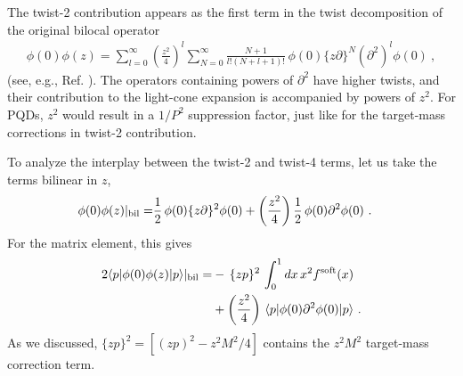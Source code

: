 \documentclass[final,5p,times,twocolumn]{elsarticle}
\newcommand{\nn}{\nonumber \\ }
\begin{document}
 




 
 The twist-2 contribution appears as the first term in the twist  decomposition 
 of the original bilocal operator 
 \begin{align}
 \phi (0) \phi(z) = \sum_{l=0}^{\infty} 
 \left ( \frac{z^2 }{4}  \right )^l  \sum_{N=0}^{\infty} 
 \frac{N+1}{l!(N+l+1)!}  \,
 \phi(0) 
\{z{\partial} \}^{N}
 ({\partial}^2)^l 
 \phi(0)  \  , 
  \label{expandphi}
\end{align}
 (see, e.g., Ref. \cite{Radyushkin:1983mj}).
 The operators containing powers of  ${\partial}^2$ have higher twists,
and  their contribution to the light-cone expansion
 is accompanied by powers of $z^2$.  For PQDs, $z^2$ would result 
 in a $1/P^2$ suppression factor, just like for  the target-mass corrections in twist-2 contribution.

 
 
  
 To analyze the interplay between the twist-2 and twist-4 terms, let us take the terms bilinear in $z$, 
  \begin{align}
 \phi (0) \phi(z)|_{\rm bil}  =  & 
 \frac{1}{2}  \,
 \phi(0) 
\{z{\partial} \}^{2}
 \phi(0)  +
 \left ( \frac{z^2 }{4}  \right ) 
 \frac{1}{2}  \,
 \phi(0) 
 {\partial}^2 
 \phi(0)  
 \  .  
  \label{bil}
\end{align}
For the matrix element, this gives
  \begin{align}
2 \langle p |  \phi (0) \phi(z) |p \rangle|_{\rm bil}  =  & 
 -  \,\{zp \}^{2} \,  \int_0^1 dx\,  x^2 f^{\rm soft}(x) 
  \nn & 
  +
 \left ( \frac{z^2 }{4}  \right ) 
 \,
 \langle p |  \phi (0)  {\partial}^2 
 \phi(0)   |p \rangle
 \  . 
  \label{mebil}
\end{align}
As we discussed, $\{zp \}^{2} = \left [  (zp)^{2}- {z^2M^2 }/{4} \right ]  $ contains the $z^2 M^2$ target-mass correction term.
\end{document}

